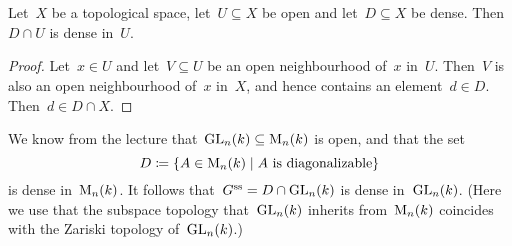 \section{}


\begin{lemma}
  Let~$X$ be a topological space, let~$U \subseteq X$ be open and let~$D \subseteq X$ be dense.
  Then~$D \cap U$ is dense in~$U$.
\end{lemma}

\begin{proof}
  Let~$x \in U$ and let~$V \subseteq U$ be an open neighbourhood of~$x$ in~$U$.
  Then~$V$ is also an open neighbourhood of~$x$ in~$X$, and hence contains an element~$d \in D$.
  Then~$d \in D \cap X$.
\end{proof}

We know from the lecture that~$\operatorname{GL}_n(k) \subseteq \operatorname{M}_{n}(k)$ is open, and that the set
\[
  D
  \defined
  \{
    A \in \mat{n}{k}
  \suchthat
    \text{$A$ is diagonalizable}
  \}
\]
is dense in~$\operatorname{M}_{n}(k)$.
It follows that~$G^{\mathrm{ss}} = D \cap \operatorname{GL}_n(k)$ is dense in~$\operatorname{GL}_n(k)$.
(Here we use that the subspace topology that~$\operatorname{GL}_n(k)$ inherits from~$\operatorname{M}_{n}(k)$ coincides with the Zariski topology of~$\operatorname{GL}_n(k)$.)

